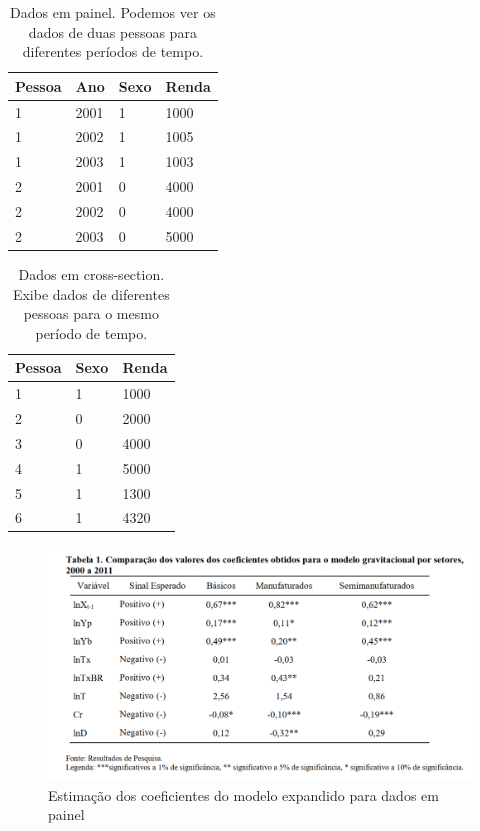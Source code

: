 \documentclass[12pt]{article}
\begin{document}
\begin{table}[h]
\centering
\begin{tabular}{l l l l}
Pessoa & Ano & Sexo & Renda\\\hline
1 & 2001 & 1 & 1000 \\
1 & 2002 & 1 & 1005 \\
1 & 2003 & 1 & 1003 \\
2 & 2001 & 0 & 4000 \\
2 & 2002 & 0 & 4000 \\
2 & 2003 & 0 & 5000 \\
\end{tabular}
\caption{\label{tab:widgets}Dados em painel. Podemos ver os dados de duas pessoas para diferentes períodos de tempo.}
\end{table}
    
\begin{table}[h]
\centering
\begin{tabular}{l l l}
Pessoa  & Sexo & Renda\\\hline
1  & 1 & 1000 \\
2  & 0 & 2000 \\
3  & 0 & 4000 \\
4  & 1 & 5000 \\
5  & 1 & 1300 \\
6  & 1 & 4320 \\
\end{tabular}
\caption{\label{tab:crosssec}Dados em cross-section. Exibe dados de diferentes pessoas para o mesmo período de tempo.}
\end{table}

\begin{figure}[h]
\centering
\includegraphics[width=1\textwidth]{panel1.png}
\caption{\label{fig:panel1}Estimação dos coeficientes do modelo expandido para dados em painel}
\end{figure}
\end{document}
